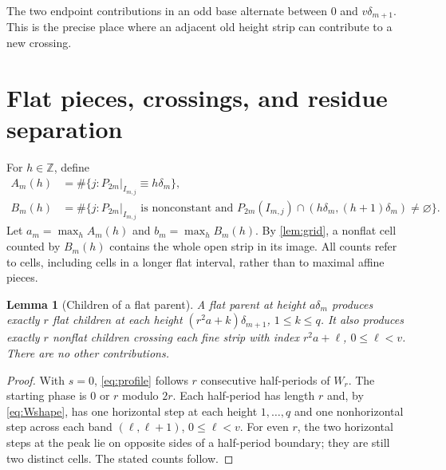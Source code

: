 \documentclass[11pt]{article}
\newtheorem{lemma}[theorem]{Lemma}
\theoremstyle{definition}
\theoremstyle{remark}
\newcommand{\Z}{\mathbb Z}
\newcommand{\card}{\#}
\begin{document}
The two endpoint contributions in an odd base alternate between $0$ and
$v\delta_{m+1}$. This is the precise place where an adjacent old height
strip can contribute to a new crossing.

\section{Flat pieces, crossings, and residue separation}\label{sec:counts}
For $h\in\Z$, define
\begin{align*}
 A_m(h)&=\card\{j:P_{2m}|_{I_{m,j}}\equiv h\delta_m\},\\
 B_m(h)&=\card\{j:P_{2m}|_{I_{m,j}}\text{ is nonconstant and }
 P_{2m}(I_{m,j})\cap(h\delta_m,(h+1)\delta_m)\ne\varnothing\}.
\end{align*}
Let $a_m=\max_hA_m(h)$ and $b_m=\max_hB_m(h)$.
By \cref{lem:grid}, a nonflat cell counted by $B_m(h)$ contains the whole
open strip in its image. All counts refer to cells, including cells in a
longer flat interval, rather than to maximal affine pieces.

\begin{lemma}[Children of a flat parent]\label{lem:flatparent}
A flat parent at height $a\delta_m$ produces exactly $r$ flat children at
each height $(r^2a+k)\delta_{m+1}$, $1\le k\le q$. It also produces
exactly $r$ nonflat children crossing each fine strip with index
$r^2a+\ell$, $0\le\ell<v$. There are no other contributions.
\end{lemma}
\begin{proof}
With $s=0$, \cref{eq:profile} follows $r$ consecutive half-periods of $W_r$.
The starting phase is $0$ or $r$ modulo $2r$. Each half-period has length
$r$ and, by \cref{eq:Wshape}, has one horizontal step at each height
$1,\ldots,q$ and one nonhorizontal step across each band
$(\ell,\ell+1)$, $0\le\ell<v$. For even $r$, the two horizontal steps at
the peak lie on opposite sides of a half-period boundary; they are still
two distinct cells. The stated counts follow.
\end{proof}
\end{document}
